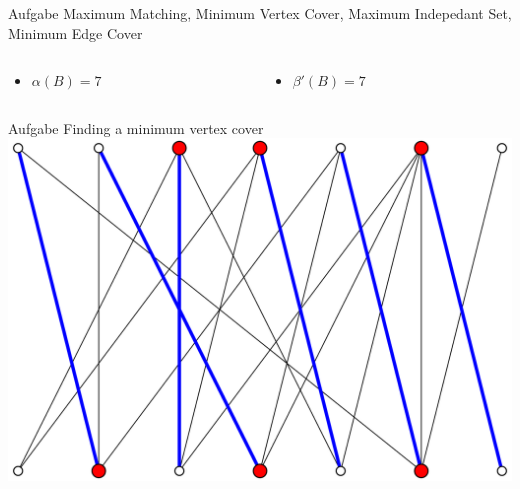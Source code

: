 \begin{frame}[t]{Aufgabe \thesection}{\small Maximum Matching, Minimum Vertex Cover, Maximum Indepedant Set, Minimum Edge Cover\vspace{0.5cm}}
\begin{columns}
\begin{column}[t]{0.25\textwidth}
{\begin{minipage}[t]{5cm}
        \end{minipage}
      }
      \begin{itemize}
        \item $\alpha(B) = 7$
      \end{itemize}
    \end{column}
    \begin{column}[t]{0.25\textwidth}
      \begin{itemize}
        \item $\beta'(B) = 7$
      \end{itemize}
    \end{column}
  \end{columns}
\end{frame}

\begin{frame}{Aufgabe \thesection}{Finding a minimum vertex cover}
  \includegraphics[height=0.5\paperheight, center]{./figures/vertex_cover_example.png}
\end{frame}

